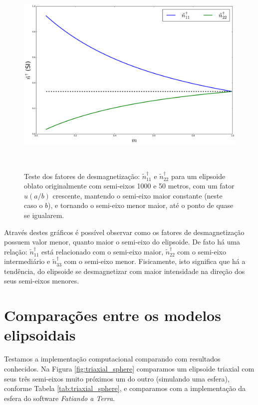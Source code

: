 \begin{figure}[hbt!]
	\centering \includegraphics[width=15cm,height=10cm]{figures/test_n_oblate}
	\caption[Teste dos fatores de desmagnetização para um elipsoide oblato.]{Teste dos fatores de desmagnetização:
		$\tilde{n}^{\dagger}_{11}$ e $\tilde{n}^{\dagger}_{22}$
		para um elipsoide oblato originalmente com semi-eixos 1000 e 50 metros, com um fator $u (a/b)$ crescente,
		mantendo o semi-eixo maior constante (neste caso o $b$), e tornando o semi-eixo menor maior, até o ponto de
		quase se igualarem.}
	\label{fig:n_oblato}
\end{figure}

Através destes gráficos é possível observar como os fatores de desmagnetização possuem valor menor, quanto maior o semi-eixo do elipsoide. De fato há uma relação: $\tilde{n}^{\dagger}_{11}$ está relacionado com o semi-eixo maior, $\tilde{n}^{\dagger}_{22}$ com o semi-eixo intermediário e $\tilde{n}^{\dagger}_{33}$ com o semi-eixo menor. Fisicamente, isto significa que há a tendência, do elipsoide se desmagnetizar com maior intensidade na direção dos seus semi-eixos menores.

\section{Comparações entre os modelos elipsoidais}

Testamos a implementação computacional comparando com resultados conhecidos. Na Figura \ref{fig:triaxial_sphere} comparamos um elipsoide triaxial com seus três semi-eixos muito próximos um do outro (simulando uma esfera), conforme Tabela \ref{tab:triaxial_sphere}, e comparamos com a implementação da esfera do software \textit{Fatiando a Terra}.
\newpage

